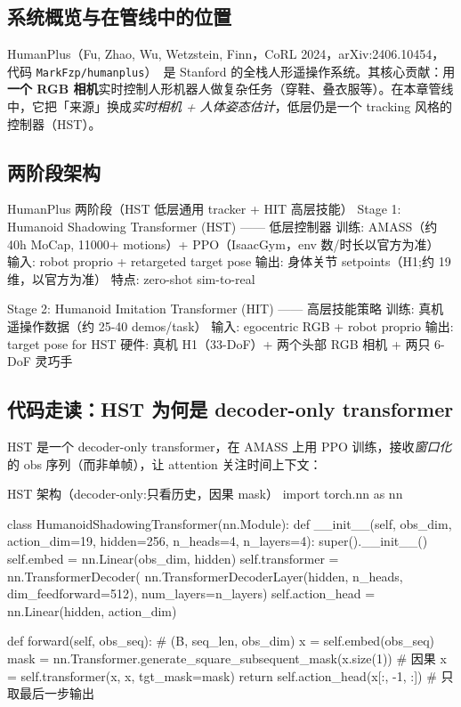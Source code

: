 \subsection{系统概览与在管线中的位置}
\label{sec:rlmc-mm-humanplus-pos}

HumanPlus（Fu, Zhao, Wu, Wetzstein, Finn，CoRL 2024，arXiv:2406.10454，代码 \texttt{MarkFzp/\allowbreak humanplus}）\,\cite{fu2024humanplus} 是 Stanford 的全栈人形遥操作系统。其核心贡献：用\textbf{一个 RGB 相机}实时控制人形机器人做复杂任务（穿鞋、叠衣服等）。在本章管线中，它把「来源」换成\emph{实时相机 + 人体姿态估计}，低层仍是一个 tracking 风格的控制器（HST）。

\subsection{两阶段架构}
\label{sec:rlmc-mm-humanplus-arch}

\begin{codebox}{HumanPlus 两阶段（HST 低层通用 tracker + HIT 高层技能）}
Stage 1: Humanoid Shadowing Transformer (HST) —— 低层控制器
  训练: AMASS（约 40h MoCap, 11000+ motions）+ PPO（IsaacGym，env 数/时长以官方为准）
  输入: robot proprio + retargeted target pose
  输出: 身体关节 setpoints（H1;约 19 维，以官方为准）
  特点: zero-shot sim-to-real

Stage 2: Humanoid Imitation Transformer (HIT) —— 高层技能策略
  训练: 真机遥操作数据（约 25-40 demos/task）
  输入: egocentric RGB + robot proprio
  输出: target pose for HST
  硬件: 真机 H1（33-DoF）+ 两个头部 RGB 相机 + 两只 6-DoF 灵巧手
\end{codebox}

\subsection{代码走读：HST 为何是 decoder-only transformer}
\label{sec:rlmc-mm-humanplus-hst}

HST 是一个 decoder-only transformer，在 AMASS 上用 PPO 训练，接收\emph{窗口化}的 obs 序列（而非单帧），让 attention 关注时间上下文：

\begin{codebox}[Python]{HST 架构（decoder-only:只看历史，因果 mask）}
import torch.nn as nn

class HumanoidShadowingTransformer(nn.Module):
    def __init__(self, obs_dim, action_dim=19, hidden=256, n_heads=4, n_layers=4):
        super().__init__()
        self.embed = nn.Linear(obs_dim, hidden)
        self.transformer = nn.TransformerDecoder(
            nn.TransformerDecoderLayer(hidden, n_heads, dim_feedforward=512),
            num_layers=n_layers)
        self.action_head = nn.Linear(hidden, action_dim)

    def forward(self, obs_seq):              # (B, seq_len, obs_dim)
        x = self.embed(obs_seq)
        mask = nn.Transformer.generate_square_subsequent_mask(x.size(1))  # 因果
        x = self.transformer(x, x, tgt_mask=mask)
        return self.action_head(x[:, -1, :]) # 只取最后一步输出
\end{codebox}

